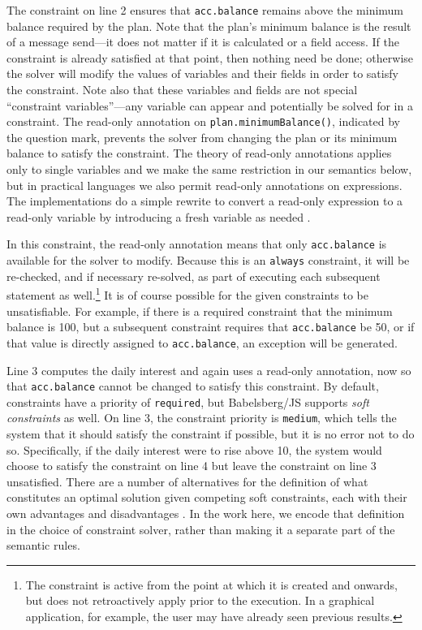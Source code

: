 \documentclass[10pt,reprint]{sigplanconf-preprint}
\begin{document}
The constraint on line 2 ensures that 
\verb!acc.balance! remains above the minimum balance required by the plan.
Note that the plan's minimum balance is the result of a message send---it does
not matter if it is calculated or a field access. If the constraint
is already satisfied at that point, then nothing need be done;
otherwise the solver will modify the values of variables and their
fields in order to satisfy the constraint. Note also that these variables
and fields are not special ``constraint variables''---any variable can appear
and potentially be solved for in a constraint. The read-only annotation
on \verb!plan.minimumBalance()!, indicated by the question mark, prevents
the solver from changing the plan or its minimum balance
to satisfy the constraint. The theory of read-only annotations applies only
to single variables \cite{borning1992constraint,felgentreff:2015:semantics}
and we make the same restriction in our
semantics below, but in practical languages we also permit read-only
annotations on expressions.  The implementations do a simple rewrite
to convert a read-only expression to a read-only variable by
introducing a fresh variable as needed \cite{felgentreff:2015:semantics}.

In this constraint, the read-only annotation means that only
\verb!acc.balance! is available for the solver to modify.
Because this is an \verb!always! constraint, it will be
re-checked, and if necessary re-solved, as part of executing each subsequent
statement as well.\footnote{The
constraint is active from the point at which it is created and onwards, but
does not retroactively apply prior to the execution. 
In a graphical application,
for example, the user may have already seen previous results.}
It is of course possible for the given constraints to be
unsatisfiable.  For example, if there is a required constraint that
the minimum balance is 100, but a subsequent constraint requires that
\verb!acc.balance! be 50, or if that value is directly assigned to
\verb!acc.balance!, an exception will be generated.

Line 3 computes the daily interest and again uses a read-only
annotation, now so that 
\verb!acc.balance! cannot be changed to satisfy this
constraint.  By default, constraints have a priority of \verb!required!,
but Babelsberg/JS supports \emph{soft constraints}
as well.  On line 3, the constraint priority is \verb!medium!,
which tells the system that it should satisfy the constraint
if possible, but it is no error not to do so. Specifically, if the
daily interest were to rise above 10, the system would choose to
satisfy the constraint on line 4 but leave the constraint on line 3
unsatisfied.  There are a number of alternatives for the definition of
what constitutes an optimal solution given competing soft
constraints, each with their own advantages and disadvantages
\cite{borning1992constraint,felgentreff:2015:semantics}.  In the work
here, we encode that definition in the choice of constraint solver,
rather than making it a separate part of the semantic rules.
\end{document}
